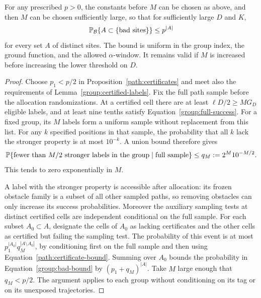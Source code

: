 \begin{proposition}\label{group:supply}
For any prescribed $p>0$, the constants before $M$ can be chosen as
above, and then $M$ can be chosen sufficiently large, so that for
sufficiently large $D$ and $K$,
\begin{equation}\label{group:bad-bound}
 \mathbb P_{\mathcal B}\{A\subset\{\text{bad sites}\}\}\le p^{|A|}
\end{equation}
for every set $A$ of distinct sites.  The bound is uniform in the
group index, the ground function, and the allowed $\alpha$-window.
It remains valid if $M$ is increased before increasing the lower
threshold on $D$.
\end{proposition}

\begin{proof}
Choose $p_1<p/2$ in Proposition~\ref{path:certificates} and meet also
the requirements of Lemma~\ref{group:certified-labels}.  Fix the
full path sample before the allocation randomizations.  At a certified
cell there are at least $\ell D/2\ge MG_D$ eligible labels, and
at least nine tenths satisfy Equation~\eqref{group:full-success}.
For a fixed group, its $M$ labels form a uniform sample without
replacement from this list.  For any $k$ specified positions in that
sample, the probability that all $k$ lack the stronger property is
at most $10^{-k}$.  A union bound therefore gives
\begin{equation}\label{group:sampling-failure}
 \mathbb P\{\text{fewer than $M/2$ stronger labels in the group}
            \mid\text{full sample}\}
 \le q_M:=2^M10^{-M/2}.
\end{equation}
This tends to zero exponentially in $M$.

A label with the stronger property is accessible after allocation:
its frozen obstacle family is a subset of all other sampled paths,
so removing obstacles can only increase its success probabilities.
Moreover the auxiliary sampling tests at distinct certified cells
are independent conditional on the full sample.  For each subset
$A_0\subset A$, designate the cells of $A_0$ as lacking certificates
and the other cells as certified but failing the sampling test.
The probability of this event is at most
$p_1^{|A_0|}q_M^{|A\setminus A_0|}$, by conditioning first on the
full sample and then using Equation~\eqref{path:certificate-bound}.
Summing over $A_0$ bounds the probability in
Equation~\eqref{group:bad-bound} by $(p_1+q_M)^{|A|}$.
Take $M$ large enough that $q_M<p/2$.  The argument applies to each
group without conditioning on its tag or on its unexposed trajectories.
\end{proof}

